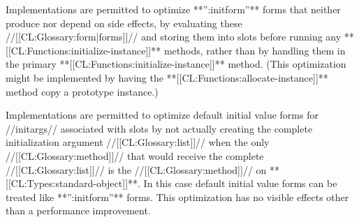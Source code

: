 Implementations are permitted to optimize **'':initform''** forms that neither produce nor depend on side effects, by evaluating these //[[CL:Glossary:form|forms]]// and storing them into slots before running any **[[CL:Functions:initialize-instance]]** methods, rather than by handling them in the primary **[[CL:Functions:initialize-instance]]** method. (This optimization might be implemented by having the **[[CL:Functions:allocate-instance]]** method copy a prototype instance.)

Implementations are permitted to optimize default initial value forms for //initargs// associated with slots by not actually creating the complete initialization argument //[[CL:Glossary:list]]// when the only //[[CL:Glossary:method]]// that would receive the complete //[[CL:Glossary:list]]// is the //[[CL:Glossary:method]]// on **[[CL:Types:standard-object]]**. In this case default initial value forms can be treated like **'':initform''** forms. This optimization has no visible effects other than a performance improvement.


